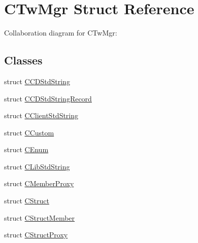 \hypertarget{struct_c_tw_mgr}{\section{C\+Tw\+Mgr Struct Reference}
\label{struct_c_tw_mgr}
}


Collaboration diagram for C\+Tw\+Mgr\+:
\subsection*{Classes}
\begin{DoxyCompactItemize}
\item 
struct \hyperlink{struct_c_tw_mgr_1_1_c_c_d_std_string}{C\+C\+D\+Std\+String}
\item 
struct \hyperlink{struct_c_tw_mgr_1_1_c_c_d_std_string_record}{C\+C\+D\+Std\+String\+Record}
\item 
struct \hyperlink{struct_c_tw_mgr_1_1_c_client_std_string}{C\+Client\+Std\+String}
\item 
struct \hyperlink{struct_c_tw_mgr_1_1_c_custom}{C\+Custom}
\item 
struct \hyperlink{struct_c_tw_mgr_1_1_c_enum}{C\+Enum}
\item 
struct \hyperlink{struct_c_tw_mgr_1_1_c_lib_std_string}{C\+Lib\+Std\+String}
\item 
struct \hyperlink{struct_c_tw_mgr_1_1_c_member_proxy}{C\+Member\+Proxy}
\item 
struct \hyperlink{struct_c_tw_mgr_1_1_c_struct}{C\+Struct}
\item 
struct \hyperlink{struct_c_tw_mgr_1_1_c_struct_member}{C\+Struct\+Member}
\item 
struct \hyperlink{struct_c_tw_mgr_1_1_c_struct_proxy}{C\+Struct\+Proxy}
\end{DoxyCompactItemize}
